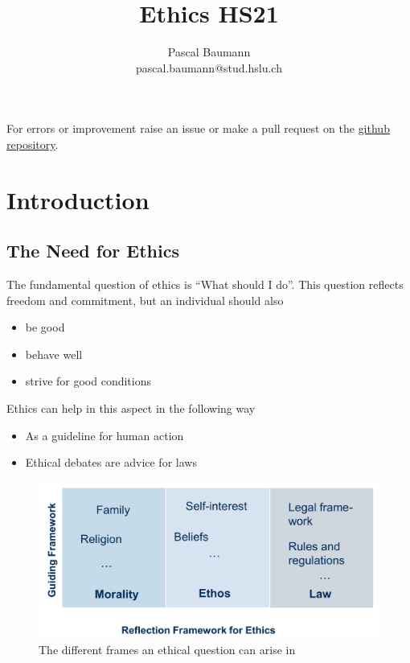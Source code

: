 \documentclass[11pt]{article}
\theoremstyle{definition}
\begin{document}
	
\title{Ethics HS21}
\author{Pascal Baumann\\pascal.baumann@stud.hslu.ch}
\maketitle

For errors or improvement raise an issue or make a pull request on the \href{https://github.com/KilnOfTheSecondFlame/mse_summaries}{github repository}.

\tableofcontents
\newpage

\section{Introduction}

\subsection{The Need for Ethics}
The fundamental question of ethics is \textquotedblleft What should I do\textquotedblright. This question reflects freedom and commitment, but an individual should also
\begin{itemize}[label=-, nosep]
	\item be good
	\item behave well
	\item strive for good conditions
\end{itemize}

\noindent
Ethics can help in this aspect in the following way
\begin{itemize}
	\item As a guideline for human action
	\item Ethical debates are advice for laws
\end{itemize}

\begin{figure}[tbh]
	\centering
	\includegraphics[width=0.8\linewidth]{img/ethics_frame}
	\caption{The different frames an ethical question can arise in}
	\label{fig:ethicsframe}
\end{figure}
\end{document}

